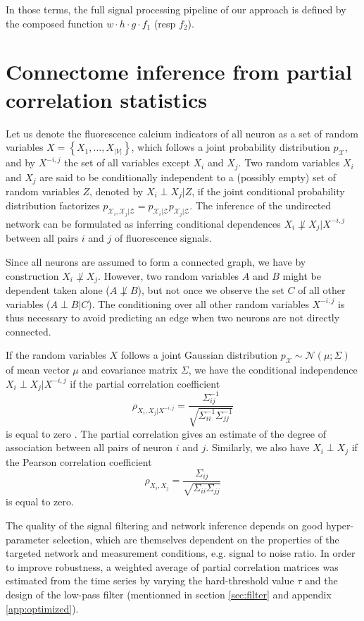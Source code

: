 \documentclass[wcp]{jmlr}
\begin{document}
In those terms, the full signal processing pipeline of our approach is defined
by the composed function $w \cdot h \cdot g \cdot f_1$ (resp $f_2$).


\section{Connectome inference from partial correlation statistics}
\label{sec:inference}

Let us denote the fluorescence calcium indicators of all neuron
as a set of random variables $X = \left\{X_1, \ldots, X_{|V|}\right\}$, which follows
a joint probability distribution $p_\mathcal{X}$, and by
$X^{-i,j}$ the set of all variables except $X_i$ and $X_j$.
Two random variables $X_i$ and $X_j$ are said to be conditionally independent
to a (possibly empty) set of random variables $Z$, denoted by $X_i \perp X_j | Z$,
if the joint conditional probability distribution factorizes
$p_{\mathcal{X}_i, \mathcal{X}_j|\mathcal{Z}} = p_{\mathcal{X}_i|\mathcal{Z}}
p_{\mathcal{X}_j|\mathcal{Z}}$.  The inference of the undirected network
can be formulated as inferring conditional dependences
$X_i \not\perp X_j | X^{-i,j}$ between all pairs $i$ and $j$ of fluorescence
signals.


Since all neurons are assumed to form a connected graph, we
have by construction $X_i \not\perp X_j$. However, two random variables $A$ and $B$ might be
dependent taken alone ($A \not\perp B$), but not once we observe the set  $C$
of all other variables ($A \perp B | C$). The conditioning over all other
random variables $X^{-i,j}$ is thus necessary to avoid predicting an edge when
two neurons are not directly connected.

If the random variables $X$ follows a joint Gaussian distribution
$p_\mathcal{X} \sim \mathcal{N}(\mu; \Sigma)$ of mean vector $\mu$ and
covariance matrix $\Sigma$, we have the conditional independence
$X_i \perp X_j | X^{-i,j}$ if the partial correlation coefficient
\[
\rho_{X_i, X_j | X^{-i,j}}
= \frac{\Sigma^{-1}_{ij}}{\sqrt{\Sigma^{-1}_{ii} \Sigma^{-1}_{jj}}}
\]
is equal to zero \citep{koller2009probabilistic}. The partial correlation gives
an estimate of the degree of association between all
pairs of neuron $i$ and $j$.
Similarly, we also have $X_i \perp X_j$ if the Pearson correlation
coefficient
\[
\rho_{X_i,X_j} = \frac{\Sigma_{ij}}{\sqrt{\Sigma_{ii}
\Sigma_{jj}}}
\]
is equal to zero.

The quality of the signal filtering and network inference depends on
good hyper-parameter selection, which are themselves dependent on the properties
of the targeted network and measurement conditions, e.g. signal to noise ratio.
In order to improve robustness, a weighted average of partial correlation
matrices was estimated from the time series by varying the hard-threshold value
$\tau$ and the design of the low-pass filter (mentionned in section \ref{sec:filter} and appendix \ref{app:optimized}).
\end{document}
